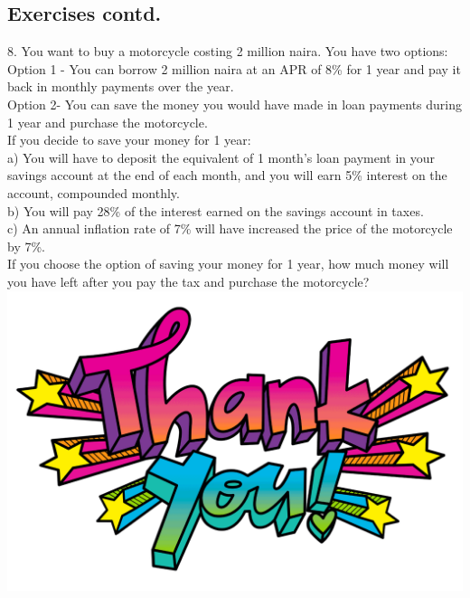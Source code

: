 \documentclass{article}
\begin{document}
		\subsection{Exercises contd.}
		8.  You want to buy a motorcycle costing 2 million naira. You have two options:
		Option 1 - You can borrow 2 million naira at an APR of 8\% for 1 year and pay it back in monthly payments over the year.\\
		Option 2-   You can save the money you would have made in loan payments during 1 year and purchase the motorcycle.\\
		If you decide to save your money for 1 year:
\\
		a) You will have to deposit the equivalent of 1 month’s loan payment in your savings account at the end of each month, and you will earn 5\% interest on the account, compounded monthly. \\
		b) You will pay 28\% of the interest earned on the savings account in taxes. \\
		c) An annual inflation rate of 7\% will have increased the price of the motorcycle by 7\%.\\
		If you choose the option of saving your money for 1 year, how much money will you have left after you pay the tax and purchase the motorcycle?
		\newpage
		\includegraphics[width=1.0\linewidth]{bruh.png}
	
\end{document}
